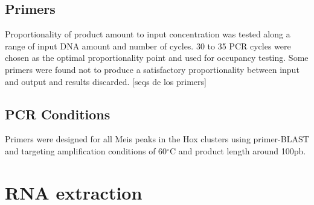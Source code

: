 \subsection{Primers}

Proportionality of product amount to input concentration was tested along a range of input DNA amount and number of cycles. 30 to 35 \ac{PCR} cycles were chosen as the optimal proportionality point and used for occupancy testing. Some primers were found not to produce a satisfactory proportionality between input and output and results discarded. [seqs de los primers]

\subsection{PCR Conditions}

Primers were designed for all Meis peaks in the Hox clusters using primer-BLAST and targeting amplification conditions of 60$^\circ$C and product length around 100pb. 



\section{RNA extraction}

